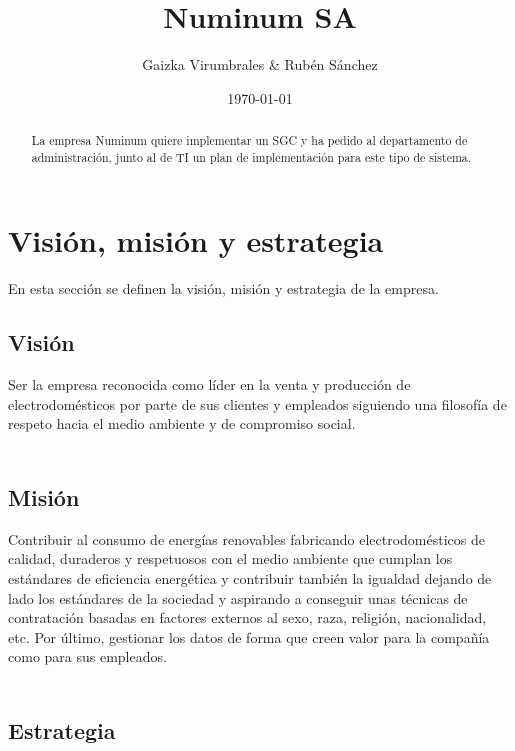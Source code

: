 \documentclass[a4paper]{article}
\title{Numinum SA}
\author{Gaizka Virumbrales \& Rubén Sánchez}
\date{\today}
\begin{document}
\maketitle
\begin{abstract}
La empresa Numinum quiere implementar un SGC y ha pedido al departamento de administración, junto al de TI un plan de implementación para este tipo de sistema.
\end{abstract}


\tableofcontents
\newpage

\section{Visión, misión y estrategia}

En esta sección se definen la visión, misión y estrategia de la empresa.

\subsection{Visión}
\label{sec:vision}

Ser la empresa reconocida como líder en la venta y producción de electrodomésticos por parte de sus clientes y empleados siguiendo una filosofía de respeto hacia el medio ambiente y de compromiso social.
\\
\\

\subsection{Misión}
\label{sec:mision}

Contribuir al consumo de energías renovables fabricando electrodomésticos de calidad, duraderos y respetuosos con el medio ambiente que cumplan los estándares de eficiencia energética y contribuir también la igualdad dejando de lado los estándares de la sociedad y aspirando a conseguir unas técnicas de contratación basadas en factores externos al sexo, raza, religión, nacionalidad, etc. Por último, gestionar los datos de forma que creen valor para la compañía como para sus empleados.
%
\\
\\

\subsection{Estrategia}
\end{document}
